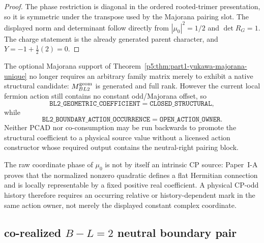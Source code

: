 \documentclass[12pt,a4paper]{article}
\begin{document}
\begin{proof}
The phase restriction is diagonal in the ordered rooted-trimer presentation,
so it is symmetric under the transpose used by the Majorana pairing slot.
The displayed norm and determinant follow directly from $|\mu_0|^2=1/2$ and
$\det R_G=1$.  The charge statement is the already generated parent character,
and $Y=-1+\tfrac12(2)=0$.
\end{proof}

\begin{corollary}
\label{p5:cor:v3103-bl2-structural-vs-action}
The optional Majorana support of
Theorem~\ref{p5:thm:part1-yukawa-majorana-unique} no longer requires an
arbitrary family matrix merely to exhibit a native structural candidate:
$M_{BL2}^{\rm geom}$ is generated and full rank.  However the current local
fermion action still contains no constant odd/Majorana offset, so
\[
 \boxed{
 \texttt{BL2\_GEOMETRIC\_COEFFICIENT}=\texttt{CLOSED\_STRUCTURAL},}
\]
while
\[
 \boxed{
 \texttt{BL2\_BOUNDARY\_ACTION\_OCCURRENCE}=\texttt{OPEN\_ACTION\_OWNER}.}
\]
Neither PCAD nor co-consumption may be run backwards to promote the structural
coefficient to a physical source value without a licensed action constructor
whose required output contains the neutral-right pairing block.
\end{corollary}

\begin{remark}[CP scope]
\label{p5:rem:v3103-bl2-cp-scope}
The raw coordinate phase of $\mu_0$ is not by itself an intrinsic CP source:
Paper~I-A proves that the normalized nonzero quadratic defines a flat Hermitian
connection and is locally representable by a fixed positive real coefficient.
A physical CP-odd history therefore requires an occurring relative or
history-dependent mark in the same action owner, not merely the displayed
constant complex coordinate.
\end{remark}

\subsection{co-realized \texorpdfstring{$B-L=2$}{B-L=2} neutral boundary pair}
\label{p5:sec:v3105-bl2-boundary-pair-corealization}
\end{document}
